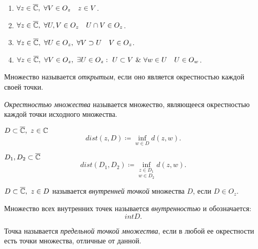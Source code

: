 

\begin{note}\leavevmode
    \begin{enumerate}
        \item $ \forall z \in \overline{\Comp}, \ \forall V \in O_z \quad z \in V $.
        \item $ \forall z \in \overline{\Comp}, \ \forall U,V \in O_z \quad U \cap V \in O_z $.
        \item $ \forall z \in \overline{\Comp}, \ \forall U \in O_z, \ \forall V \supset U \quad V \in O_z $.
        \item $ \forall z \in \overline{\Comp}, \ \forall V \in O_z, \ \exists U \in O_z : \ U \subset V \ \& \ \forall w \in U \quad U \in O_w  $.
    \end{enumerate}
\end{note}

\begin{definition}
    Множество называется \emph{открытым}, если оно является окрестностью каждой своей точки.
\end{definition}

\begin{definition}
    \emph{Окрестностью множества} называется множество, являющееся окрестностью каждой точки исходного множества.
\end{definition}

\begin{note}
    $ D \subset \overline{\mathbb{C}}, \ z \in \mathbb{C} $
    \[
        dist(z,D) \coloneqq \underset{w\in D}{\inf} d(z,w).
    \]

    $ D_1,D_2 \subset \overline{\mathbb{C}} $
    \[
        dist(D_1,D_2) \coloneqq \underset{w \in D_2}{\underset{z\in D_1}{\inf}} d(z,w).
    \]
\end{note}

\begin{definition}
    $ D \subset \overline{\mathbb{C}}, \ z \in D $ называется \emph{внутренней точкой} множества $ D $, если $ D \in O_z $.
\end{definition}

\begin{definition}[Внутренность]
    Множество всех внутренних точек называется \emph{внутренностью} и обозначается:
    \[
        int D.
    \]
\end{definition}

\begin{definition}
    Точка называется \emph{предельной точкой множества}, если в любой ее окрестности есть точки множества, отличные от данной.
\end{definition}

